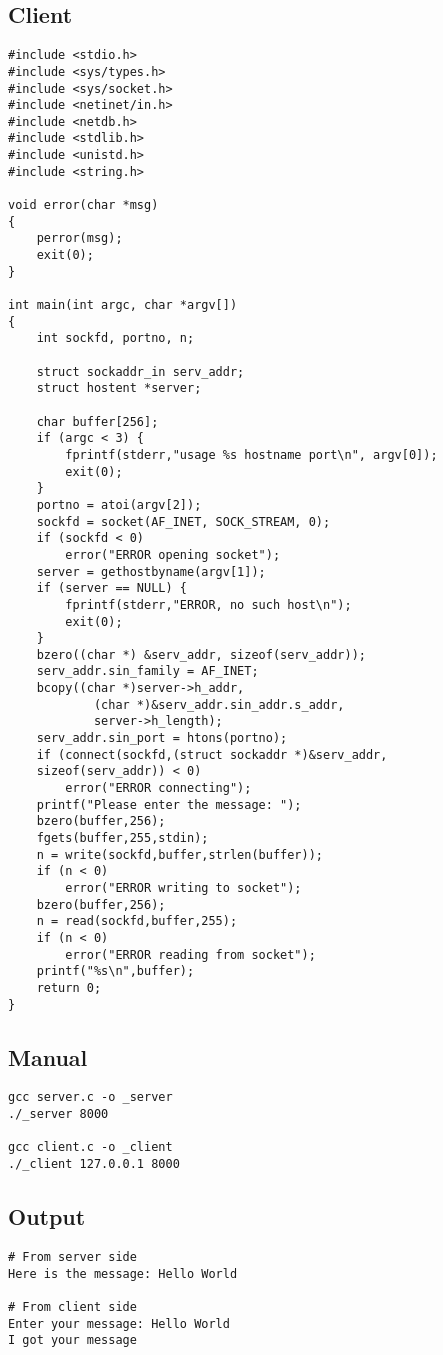 \documentclass[12pt]{article}
\begin{document}
\subsection{Client}

\begin{lstlisting}
#include <stdio.h>
#include <sys/types.h>
#include <sys/socket.h>
#include <netinet/in.h>
#include <netdb.h> 
#include <stdlib.h>
#include <unistd.h>
#include <string.h>

void error(char *msg)
{
	perror(msg);
	exit(0);
}

int main(int argc, char *argv[])
{
	int sockfd, portno, n;

	struct sockaddr_in serv_addr;
	struct hostent *server;

	char buffer[256];
	if (argc < 3) {
		fprintf(stderr,"usage %s hostname port\n", argv[0]);
		exit(0);
	}
	portno = atoi(argv[2]);
	sockfd = socket(AF_INET, SOCK_STREAM, 0);
	if (sockfd < 0) 
		error("ERROR opening socket");
	server = gethostbyname(argv[1]);
	if (server == NULL) {
		fprintf(stderr,"ERROR, no such host\n");
		exit(0);
	}
	bzero((char *) &serv_addr, sizeof(serv_addr));
	serv_addr.sin_family = AF_INET;
	bcopy((char *)server->h_addr, 
			(char *)&serv_addr.sin_addr.s_addr,
			server->h_length);
	serv_addr.sin_port = htons(portno);
	if (connect(sockfd,(struct sockaddr *)&serv_addr,
	sizeof(serv_addr)) < 0) 
		error("ERROR connecting");
	printf("Please enter the message: ");
	bzero(buffer,256);
	fgets(buffer,255,stdin);
	n = write(sockfd,buffer,strlen(buffer));
	if (n < 0) 
		error("ERROR writing to socket");
	bzero(buffer,256);
	n = read(sockfd,buffer,255);
	if (n < 0) 
		error("ERROR reading from socket");
	printf("%s\n",buffer);
	return 0;
}
\end{lstlisting}

\subsection{Manual}

\begin{lstlisting}
gcc server.c -o _server
./_server 8000

gcc client.c -o _client
./_client 127.0.0.1 8000
\end{lstlisting}

\subsection{Output}

\begin{lstlisting}
# From server side
Here is the message: Hello World

# From client side
Enter your message: Hello World
I got your message
\end{lstlisting}
\end{document}
